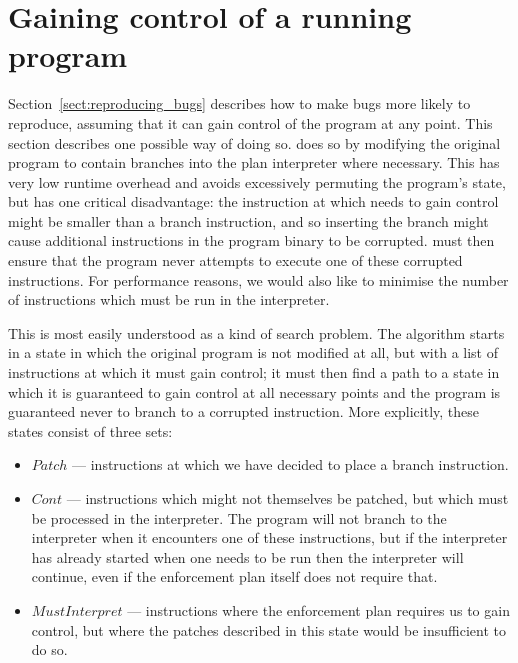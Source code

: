 \section{Gaining control of a running program}
\label{sect:enforce:gain_control}

Section~\ref{sect:reproducing_bugs} describes how to make bugs more
likely to reproduce, assuming that it can gain control of the program
at any point.  This section describes one possible way of doing so.
{\Implementation} does so by modifying the original program to contain
branches into the plan interpreter where necessary.  This has very low
runtime overhead and avoids excessively permuting the program's state,
but has one critical disadvantage: the instruction at which
{\implementation} needs to gain control might be smaller than a branch
instruction, and so inserting the branch might cause additional
instructions in the program binary to be corrupted.  {\Implementation}
must then ensure that the program never attempts to execute one of
these corrupted instructions.  For performance reasons, we would also
like to minimise the number of instructions which must be run in the
interpreter.

This is most easily understood as a kind of search problem.  The
algorithm starts in a state in which the original program is not
modified at all, but with a list of instructions at which it must gain
control; it must then find a path to a state in which it is guaranteed
to gain control at all necessary points and the program is guaranteed
never to branch to a corrupted instruction.  More explicitly, these
states consist of three sets:

\begin{itemize}
\item $\mathit{Patch}$ --- instructions at which we have decided to place a
  branch instruction.
\item $\mathit{Cont}$ --- instructions which might not themselves be
  patched, but which must be processed in the interpreter.  The
  program will not branch to the interpreter when it encounters one of
  these instructions, but if the interpreter has already started when
  one needs to be run then the interpreter will continue, even if the
  enforcement plan itself does not require that.
\item $\mathit{MustInterpret}$ --- instructions where the enforcement
  plan requires us to gain control, but where the patches described in
  this state would be insufficient to do so.
\end{itemize}

